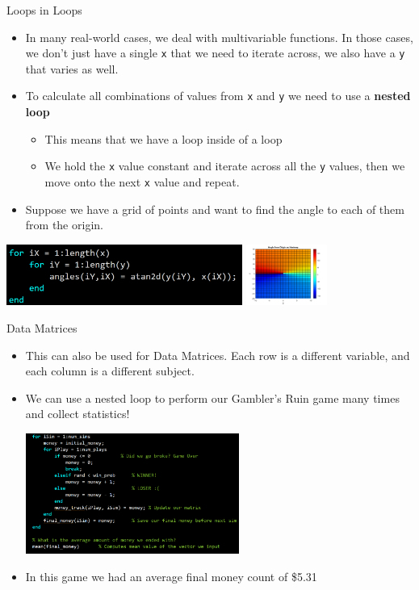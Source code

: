 {}\documentclass[letterpaper,
compress,
xcolor=x11names,
]{beamer}
\begin{document}
\begin{frame}{Loops in Loops}
	\footnotesize
	\begin{itemize}
		\item In many real-world cases, we deal with multivariable functions. In those cases, we don't just have a single \texttt{x} that we need to iterate across, we also have a \texttt{y} that varies as well. 
		\item To calculate all combinations of values from \texttt{x} and \texttt{y} we need to use a \textbf{nested loop}
		\begin{itemize}
			\item This means that we have a loop inside of a loop
			\item We hold the \texttt{x} value constant and iterate across all the \texttt{y} values, then we move onto the next \texttt{x} value and repeat.
		\end{itemize}
		\item Suppose we have a grid of points and want to find the angle to each of them from the origin.
	\end{itemize}
	\begin{center}
		\includegraphics[height = 2cm]{angle_nested_loop.png}
		\includegraphics[height = 2cm]{angle_surface.png}
	\end{center}
\end{frame}


\begin{frame}{Data Matrices}
	\footnotesize
	\begin{itemize}
		\item This can also be used for Data Matrices. Each row is a different variable, and each column is a different subject.
		\item We can use a nested loop to perform our Gambler's Ruin game many times and collect statistics!
		\begin{center}
			\includegraphics[width = 7cm]{gamblers_ruin.png}
		\end{center}
		\item In this game we had an average final money count of \$5.31
	\end{itemize}
\end{frame}
\end{document}
